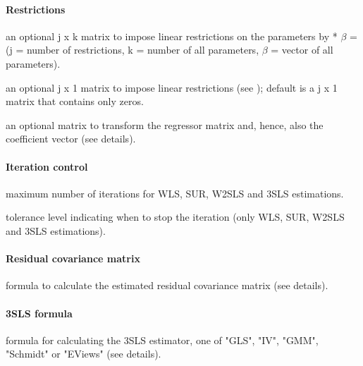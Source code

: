 \paragraph{Restrictions}   
 an optional j x k matrix to impose linear
   restrictions on the parameters by  * $\beta$ = 
   (j = number of restrictions, k = number of all parameters,
   $\beta$ = vector of all parameters).

 an optional j x 1 matrix to impose linear
   restrictions (see ); default is a j x 1 matrix
   that contains only zeros.

 an optional matrix to transform the regressor matrix and,
   hence, also the coefficient vector (see details).

\paragraph{Iteration control}
 maximum number of iterations for WLS, SUR, W2SLS and
   3SLS estimations.

 tolerance level indicating when to stop the iteration (only
   WLS, SUR, W2SLS and 3SLS estimations).

\paragraph{Residual covariance matrix}   
 formula to calculate the estimated residual covariance
   matrix (see details).

\paragraph{3SLS formula}   
 formula for calculating the 3SLS estimator,
   one of "GLS", "IV", "GMM", "Schmidt" or "EViews" (see details).

